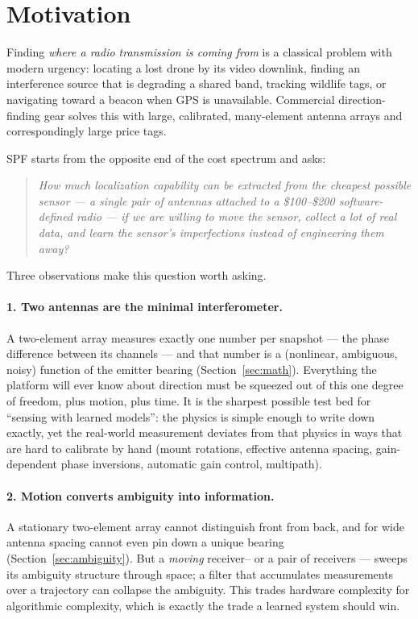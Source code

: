 \section{Motivation}
\label{sec:motivation}

Finding \emph{where a radio transmission is coming from} is a classical problem
with modern urgency: locating a lost drone by its video downlink, finding an
interference source that is degrading a shared band, tracking wildlife tags,
or navigating toward a beacon when GPS is unavailable. Commercial
direction-finding gear solves this with large, calibrated, many-element
antenna arrays and correspondingly large price tags.

SPF starts from the opposite end of the cost spectrum and asks:

\begin{quote}
\emph{How much localization capability can be extracted from the cheapest
possible sensor --- a single pair of antennas attached to a \$100--\$200
software-defined radio --- if we are willing to move the sensor, collect a lot
of real data, and learn the sensor's imperfections instead of engineering them
away?}
\end{quote}

Three observations make this question worth asking.

\paragraph{1. Two antennas are the minimal interferometer.}
A two-element array measures exactly one number per snapshot --- the phase
difference between its channels --- and that number is a (nonlinear,
ambiguous, noisy) function of the emitter bearing
(Section~\ref{sec:math}). Everything the platform will ever know about
direction must be squeezed out of this one degree of freedom, plus motion,
plus time. It is the sharpest possible test bed for ``sensing with learned
models'': the physics is simple enough to write down exactly, yet the
real-world measurement deviates from that physics in ways that are hard to
calibrate by hand (mount rotations, effective antenna spacing, gain-dependent
phase inversions, automatic gain control, multipath).

\paragraph{2. Motion converts ambiguity into information.}
A stationary two-element array cannot distinguish front from back, and for
wide antenna spacing cannot even pin down a unique bearing
(Section~\ref{sec:ambiguity}). But a \emph{moving} receiver-- or a pair of
receivers --- sweeps its ambiguity structure through space; a filter that
accumulates measurements over a trajectory can collapse the ambiguity. This
trades hardware complexity for algorithmic complexity, which is exactly the
trade a learned system should win.

